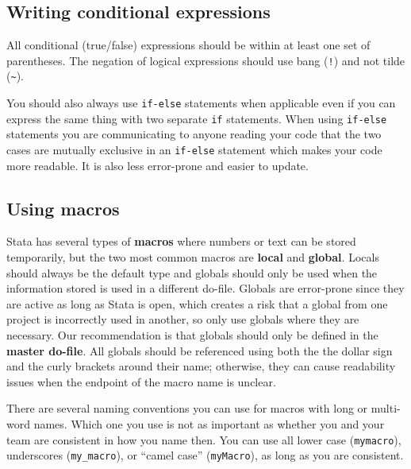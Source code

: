 
\subsection{Writing conditional expressions}

All conditional (true/false) expressions should be within at least one set of parentheses.
The negation of logical expressions should use bang (\texttt{!}) and not tilde (\texttt{\~}).


You should also always use \texttt{if-else} statements when applicable even if you can express the same
thing with two separate \texttt{if} statements. When using \texttt{if-else} statements you are
communicating to anyone reading your code that the two cases are mutually exclusive in an \texttt{if-else} statement
which makes your code more readable. It is also less error-prone and easier to update.


\subsection{Using macros}

Stata has several types of \textbf{macros} where numbers or text can be stored temporarily, but the two most common
macros are \textbf{local} and \textbf{global}. Locals should always be the default type and globals should only
be used when the information stored is used in a different do-file. Globals are error-prone since they are
active as long as Stata is open, which creates a risk that a global from one project is incorrectly used in
another, so only use globals where they are necessary. Our recommendation is that globals should only be defined in the \textbf{master do-file}.
All globals should be referenced using both the the dollar sign and the curly brackets around their name;
otherwise, they can cause readability issues when the endpoint of the macro name is unclear.

There are several naming conventions you can use for macros with long or multi-word names.
Which one you use is not as important as whether you and your team are consistent in how you name then.
You can use all lower case (\texttt{mymacro}), underscores (\texttt{my\_macro}), or ``camel case'' (\texttt{myMacro}), as long as you are consistent.

